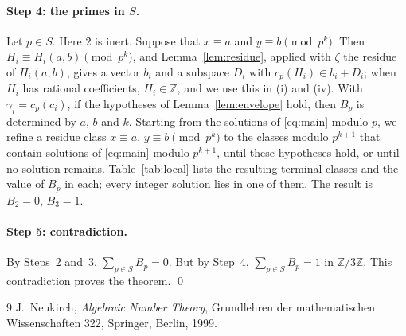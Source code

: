 \documentclass[11pt]{article}
\newcommand{\Z}{\mathbb{Z}}
\begin{document}
\paragraph{Step 4: the primes in $S$.} Let $p\in S$. Here $2$ is inert. Suppose that $x\equiv a$ and $y\equiv b\pmod{p^k}$. Then $H_i\equiv H_i(a,b)\pmod{p^k}$, and Lemma~\ref{lem:residue}, applied with $\zeta$ the residue of $H_i(a,b)$, gives a vector $b_i$ and a subspace $D_i$ with $c_p(H_i)\in b_i+D_i$; when $H_i$ has rational coefficients, $H_i\in\Z$, and we use this in (i) and (iv). With $\gamma_i=c_p(c_i)$, if the hypotheses of Lemma~\ref{lem:envelope} hold, then $B_p$ is determined by $a$, $b$ and $k$. Starting from the solutions of \eqref{eq:main} modulo $p$, we refine a residue class $x\equiv a$, $y\equiv b\pmod{p^k}$ to the classes modulo $p^{k+1}$ that contain solutions of \eqref{eq:main} modulo $p^{k+1}$, until these hypotheses hold, or until no solution remains. Table~\ref{tab:local} lists the resulting terminal classes and the value of $B_p$ in each; every integer solution lies in one of them. The result is $B_{2}=0$, $B_{3}=1$.

\paragraph{Step 5: contradiction.} By Steps~2 and~3, $\sum_{p\in S}B_p=0$. But by Step~4, $\sum_{p\in S}B_p=1$ in $\Z/3\Z$. This contradiction proves the theorem.
\qed


\begin{thebibliography}{9}
 J.~Neukirch, \emph{Algebraic Number Theory}, Grundlehren der mathematischen Wissenschaften 322, Springer, Berlin, 1999.
\end{thebibliography}
\end{document}
